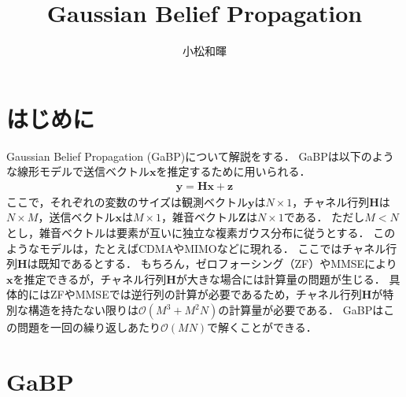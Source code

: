 \documentclass[twocolumn, a4paper]{ieicejsp}
\title{{\bf  Gaussian Belief Propagation
        }}
\author{小松和暉}
\begin{document}
\maketitle

\section{はじめに}


Gaussian Belief Propagation (GaBP)について解説をする．
GaBPは以下のような線形モデルで送信ベクトル$\mathbf{x}$を推定するために用いられる．
\begin{align}
  \mathbf{y} = \mathbf{H} \mathbf{x} + \mathbf{z}
\end{align}
ここで，それぞれの変数のサイズは観測ベクトル$\mathbf{y}$は$N \times 1$，チャネル行列$\mathbf{H}$は$N \times M$，送信ベクトル$\mathbf{x}$は$M \times 1$，雑音ベクトル$\mathbf{Z}$は$N \times 1$である．
ただし$M < N$とし，雑音ベクトルは要素が互いに独立な複素ガウス分布に従うとする．
このようなモデルは，たとえばCDMAやMIMOなどに現れる．
ここではチャネル行列$\mathbf{H}$は既知であるとする．
もちろん，ゼロフォーシング（ZF）やMMSEにより$\mathbf{x}$を推定できるが，チャネル行列$\mathbf{H}$が大きな場合には計算量の問題が生じる．
具体的にはZFやMMSEでは逆行列の計算が必要であるため，チャネル行列$\mathbf{H}$が特別な構造を持たない限りは$\mathcal{O}(M^3 + M^2 N)$の計算量が必要である．
GaBPはこの問題を一回の繰り返しあたり$\mathcal{O}(MN)$で解くことができる．

\section{GaBP}
\end{document}
